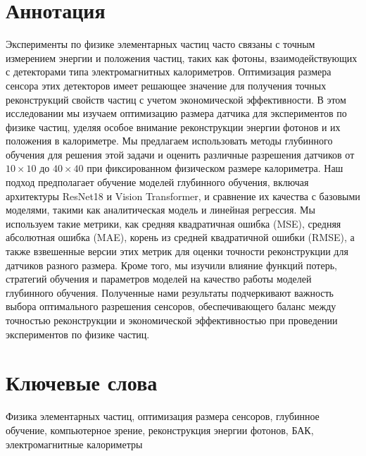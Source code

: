 \documentclass[a4paper,12pt]{extarticle}
\begin{document}
\newpage
\setcounter{page}{2}

{
	\hypersetup{linkcolor=black}
	\tableofcontents
}

\newpage

\newpage

\section*{Аннотация}   %
Эксперименты по физике элементарных частиц часто связаны с точным измерением энергии и положения частиц, таких как фотоны, взаимодействующих с детекторами типа электромагнитных калориметров. Оптимизация размера сенсора этих детекторов имеет решающее значение для получения точных реконструкций свойств частиц с учетом экономической эффективности. В этом исследовании мы изучаем оптимизацию размера датчика для экспериментов по физике частиц, уделяя особое внимание реконструкции энергии фотонов и их положения в калориметре. Мы предлагаем использовать методы глубинного обучения для решения этой задачи и оценить различные разрешения датчиков от $10 \times 10$ до $40 \times 40$ при фиксированном физическом размере калориметра. Наш подход предполагает обучение моделей глубинного обучения, включая архитектуры ResNet18 и Vision Transformer, и сравнение их качества с базовыми моделями, такими как аналитическая модель и линейная регрессия. Мы используем такие метрики, как средняя квадратичная ошибка (MSE), средняя абсолютная ошибка (MAE), корень из средней квадратичной ошибки (RMSE), а также взвешенные версии этих метрик для оценки точности реконструкции для датчиков разного размера. Кроме того, мы изучили влияние функций потерь, стратегий обучения и параметров моделей на качество работы моделей глубинного обучения. Полученные нами результаты подчеркивают важность выбора оптимального разрешения сенсоров, обеспечивающего баланс между точностью реконструкции и экономической эффективностью при проведении экспериментов по физике частиц.


\section*{Ключевые слова}
Физика элементарных частиц, оптимизация размера сенсоров, глубинное обучение, компьютерное зрение, реконструкция энергии фотонов, БАК, электромагнитные калориметры
\end{document}
